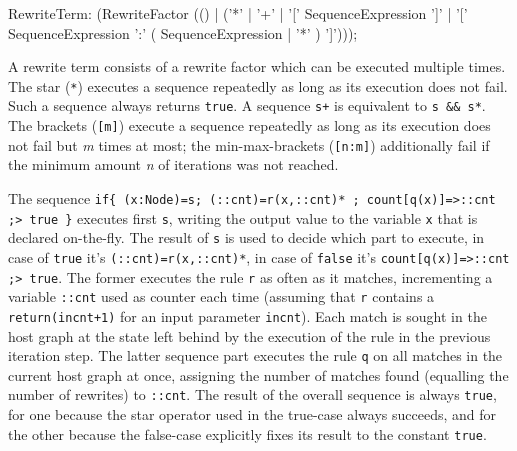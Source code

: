 \begin{rail}
  RewriteTerm: 
    (RewriteFactor (() | ('*' | '+' | '[' SequenceExpression ']' | '[' SequenceExpression ':' ( SequenceExpression | '*' ) ']')));
\end{rail}

A rewrite term consists of a rewrite factor which can be executed multiple times.
The star (\texttt{*}) executes a sequence repeatedly as long as its execution does not fail. 
Such a sequence always returns \texttt{true}.
A sequence \verb#s+# is equivalent to \verb#s && s*#.
The brackets (\texttt{[m]}) execute a sequence repeatedly as long as its execution does not fail but \emph{m} times at most;
the min-max-brackets (\texttt{[n:m]}) additionally fail if the minimum amount \emph{n} of iterations was not reached.

\begin{example}
The sequence \verb#if{ (x:Node)=s; (::cnt)=r(x,::cnt)* ; count[q(x)]=>::cnt ;> true }# 
executes first \texttt{s}, writing the output value to the variable \texttt{x} that is declared on-the-fly.
The result of \texttt{s} is used to decide which part to execute, in case of \texttt{true} it's \verb#(::cnt)=r(x,::cnt)*#,
in case of \texttt{false} it's \verb#count[q(x)]=>::cnt ;> true#.
The former executes the rule \texttt{r} as often as it matches, incrementing a variable \texttt{::cnt} used as counter each time (assuming that \texttt{r} contains a \verb#return(incnt+1)# for an input parameter \texttt{incnt}).
Each match is sought in the host graph at the state left behind by the execution of the rule in the previous iteration step.
The latter sequence part executes the rule \texttt{q} on all matches in the current host graph at once, assigning the number of matches found (equalling the number of rewrites) to \texttt{::cnt}.
The result of the overall sequence is always \texttt{true}, for one because the star operator used in the true-case always succeeds, and for the other because the false-case explicitly fixes its result to the constant \texttt{true}.
\end{example}

